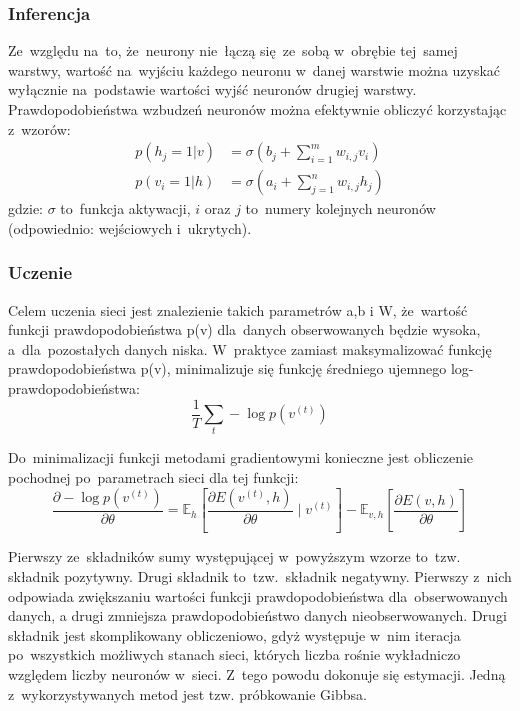 \subsubsection{Inferencja}
Ze~względu na~to, że~neurony nie~łączą się~ze~sobą w~obrębie tej~samej warstwy, wartość na~wyjściu każdego
neuronu w~danej warstwie można uzyskać wyłącznie na~podstawie wartości wyjść neuronów drugiej warstwy.
Prawdopodobieństwa wzbudzeń neuronów można efektywnie obliczyć korzystając z~wzorów:
\begin{equation}
    \begin{split}
        p(h_{j}=1|v)&=\sigma(b_{j}+\sum\limits_{i=1}^{m}w_{i,j}v_{i}) \\
        p(v_{i}=1|h)&=\sigma(a_{i}+\sum\limits_{j=1}^{n}w_{i,j}h_{j})
    \end{split}
	\label{eqn:rbm_inference}
\end{equation}
gdzie: $\sigma$ to~funkcja aktywacji, $i$ oraz $j$ to~numery kolejnych neuronów (odpowiednio: wejściowych i~ukrytych).


\subsubsection{Uczenie}
Celem uczenia sieci jest znalezienie takich parametrów a,b i W, że~wartość funkcji prawdopodobieństwa p(v)
dla~danych obserwowanych będzie wysoka, a~dla~pozostałych danych niska. W~praktyce zamiast maksymalizować
funkcję prawdopodobieństwa p(v), minimalizuje się funkcję średniego ujemnego log-prawdopodobieństwa:
$$\frac{1}{T}\sum\limits_{t}-\log{p(v^{(t)})}$$

Do~minimalizacji funkcji metodami gradientowymi konieczne jest obliczenie pochodnej po~parametrach sieci
dla tej funkcji:
$$\frac{\partial-\log{p(v^{(t)})}}{\partial{\theta}}=\mathbb{E}_h[\frac{\partial{E(v^{(t)},h)}}{\partial{\theta}}\mid{v^{(t)}}]-\mathbb{E}_{v,h}[\frac{\partial{E(v,h)}}{\partial{\theta}}]$$

Pierwszy ze~składników sumy występującej w~powyższym wzorze to~tzw. składnik pozytywny. Drugi składnik
to~tzw.~składnik negatywny. Pierwszy z~nich odpowiada zwiększaniu wartości funkcji prawdopodobieństwa
dla~obserwowanych danych, a drugi zmniejsza prawdopodobieństwo danych nieobserwowanych. Drugi składnik jest
skomplikowany obliczeniowo, gdyż występuje w~nim iteracja po~wszystkich możliwych stanach sieci, których
liczba rośnie wykładniczo względem liczby neuronów w~sieci. Z~tego powodu dokonuje się estymacji. Jedną
z~wykorzystywanych metod jest tzw. próbkowanie Gibbsa. 

